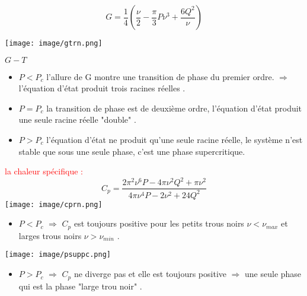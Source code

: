 \documentclass{beamer}
\begin{document}
\begin{frame}
$$G=\dfrac{1}{4}\left(\dfrac{\nu}{2}-\dfrac{\pi}{3}P\nu^{3}+\dfrac{6Q^{2}}{\nu} \right)$$

		\texttt{[image: image/gtrn.png]}
	\end{frame}
\begin{frame}
		
		\begin{block}{$G-T$}
			\begin{itemize}
				\item $P<P_{c} $ l'allure de G montre une transition de phase du premier ordre. $\Rightarrow$ l'équation d’état produit trois racines réelles .
				
				\item $P = P_{c}$ la transition de phase est de deuxième ordre, l'équation d’état produit une
				seule racine réelle "double" .
				\item $P > P_{c}$ l'équation d'état ne produit qu'une seule racine réelle, le système n'est
				stable que sous une seule phase, c'est une phase supercritique.
				
			\end{itemize}
		\end{block}
	
\end{frame}
\begin{frame}
\textcolor{red}{la chaleur spécifique :} 
$$C_{p}=\dfrac{2\pi^{2}\nu^{6}P-4\pi \nu^{2}Q^{2}+\pi \nu^{2}}{4\pi \nu^{4}P-2\nu^{2}+24Q^{2}}$$
\pause
	\texttt{[image: image/cprn.png]}
		\pause
\begin{itemize}
	\item $P<P_{c} $ $\Rightarrow$ $C_{p}$ est
	toujours positive pour les petits trous noirs $ \nu <\nu_{max} $ et larges trous noirs $ \nu > \nu_{min}$ .
		\end{itemize}
	

	
	\end{frame}
	\begin{frame}
	
		\texttt{[image: image/psuppc.png]}
	\begin{itemize}
		\item $P>P_{c} $ $\Rightarrow$ $C_{p}$  ne diverge pas et elle est toujours positive $\Rightarrow$ une seule phase qui est la phase "large trou noir" .
	\end{itemize}

	


\end{frame}
\end{document}
